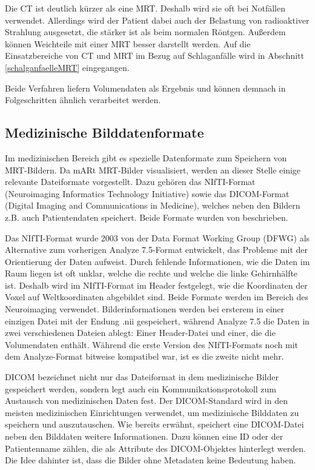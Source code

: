 Die CT ist deutlich kürzer als eine MRT. Deshalb wird sie oft bei Notfällen verwendet. Allerdings wird der Patient dabei auch der Belastung von radioaktiver Strahlung ausgesetzt, die stärker ist als beim normalen Röntgen. Außerdem können Weichteile mit einer MRT besser darstellt werden. \cite{ct2}
Auf die Einsatzbereiche von CT und MRT im Bezug auf Schlaganfälle wird in Abschnitt \ref{schalganfaelleMRT} eingegangen.

Beide Verfahren liefern Volumendaten als Ergebnis und können demnach in Folgeschritten ähnlich verarbeitet werden.

\pagebreak
\subsection{Medizinische Bilddatenformate}
\label{datenformate}
 
Im medizinischen Bereich gibt es spezielle Datenformate zum Speichern von MRT-Bildern. Da mARt MRT-Bilder visualisiert, werden an dieser Stelle einige relevante Dateiformate vorgestellt. Dazu gehören das NIfTI-Format (Neuroimaging Informatics Technology Initiative) sowie das DICOM-Format (Digital Imaging and Communications in Medicine), welches neben den Bildern z.B. auch Patientendaten speichert. Beide Formate wurden von \cite{Larobina13} beschrieben.

Das NIfTI-Format wurde 2003 von der Data Format Working Group (DFWG) als Alternative zum vorherigen Analyze 7.5-Format entwickelt, das Probleme mit der Orientierung der Daten aufweist. Durch fehlende Informationen, wie die Daten im Raum liegen ist oft unklar, welche die rechte und welche die linke Gehirnhälfte ist. Deshalb wird im NIfTI-Format im Header festgelegt, wie die Koordinaten der Voxel auf Weltkoordinaten abgebildet sind. Beide Formate werden im Bereich des Neuroimaging verwendet.
Bilderinformationen werden bei ersterem in einer einzigen Datei mit der Endung .nii gespeichert, während Analyze 7.5 die Daten in zwei verschiedenen Dateien ablegt: Einer Header-Datei und einer, die die Volumendaten enthält. Während die erste Version des NIfTI-Formats noch mit dem Analyze-Format bitweise kompatibel war, ist es die zweite nicht mehr. 
 

DICOM bezeichnet nicht nur das Dateiformat in dem medizinische Bilder gespeichert werden, sondern  legt auch ein Kommunikationsprotokoll zum Austausch von medizinischen Daten fest. Der DICOM-Standard wird in den meisten medizinischen Einrichtungen verwendet, um medizinische Bilddaten zu speichern und auszutauschen.
Wie bereits erwähnt, speichert eine DICOM-Datei neben den Bilddaten weitere Informationen. Dazu können eine ID oder der Patientenname zählen, die als Attribute des DICOM-Objektes hinterlegt werden. Die Idee dahinter ist, dass die Bilder ohne Metadaten keine Bedeutung haben. 

